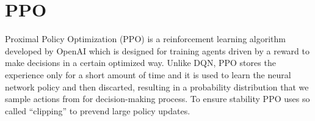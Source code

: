 \section{PPO}
Proximal Policy Optimization (PPO) is a reinforcement learning algorithm developed by OpenAI which is designed for training agents driven by a reward to make decisions in a certain optimized way. Unlike DQN, PPO stores the experience only for a short amount of time and it is used to learn the neural network policy and then discarted, resulting in a probability distribution that we sample actions from for decision-making process. To ensure stability PPO uses so called “clipping” to prevend large policy updates. 